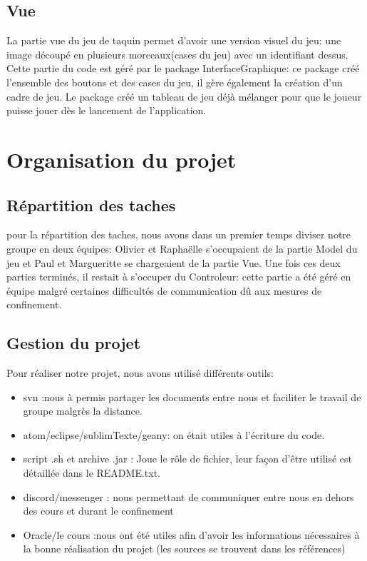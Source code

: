\documentclass[12pt]{article}
\begin{document}
\subsection{Vue}
	La partie vue du jeu de taquin permet d'avoir une version visuel du jeu: une image découpé en plusieurs morceaux(cases du jeu) avec un identifiant dessus. Cette partie du code est géré par le package InterfaceGraphique: ce package créé l'ensemble des boutons et des cases du jeu, il gère également la création d'un cadre de jeu. Le package créé un tableau de jeu déjà mélanger pour que le joueur puisse jouer dès le lancement de l'application. 

\vspace{10pt}

\section{Organisation du projet}

\subsection{Répartition des taches}
pour la répartition des taches, nous avons dans un premier temps diviser notre groupe en deux équipes: Olivier et Raphaëlle s’occupaient de la partie Model du jeu et Paul et Margueritte se chargeaient de la partie Vue. Une fois ces deux parties terminés, il restait à s’occuper du Controleur: cette partie a été géré en équipe malgré certaines difficultés de communication dû aux mesures de confinement.

\subsection{Gestion du projet}
Pour réaliser notre projet, nous avons utilisé différents outils:
\begin{itemize}
	\item svn :nous à permis partager les documents entre nous et faciliter le travail de groupe malgrès la distance.
	\item atom/eclipse/sublimTexte/geany: on était utiles à l'écriture du code.
	\item script .sh et archive .jar : Joue le rôle de fichier, leur façon d'être utilisé est détaillée dans le README.txt.
	\item discord/messenger : nous permettant de communiquer entre nous en dehors des cours et durant le confinement 
	\item Oracle/le cours :nous ont été utiles afin d'avoir les informations nécessaires à la bonne réalisation du projet (les sources se trouvent dans les références)
\end{itemize}
\end{document}
